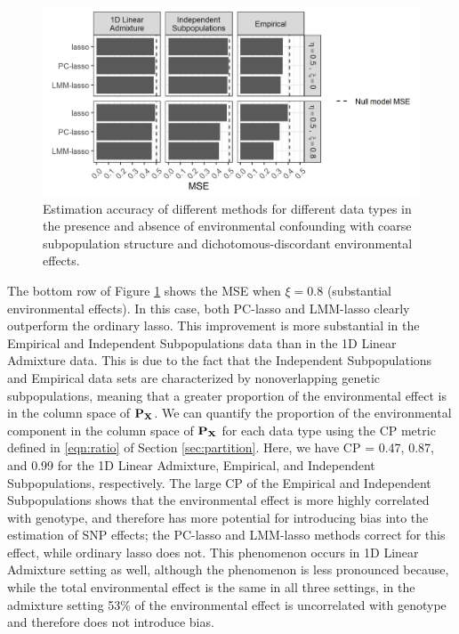 \begin{figure}[H]
    \centering
    \includegraphics[width = \textwidth]{figures/beta_mse.png}
    \caption{Estimation accuracy of different methods for different data types in the presence and absence of environmental confounding with coarse subpopulation structure and dichotomous-discordant environmental effects.}
    \label{fig:mse}
\end{figure}

The bottom row of Figure \ref{fig:mse} shows the MSE when $\xi = 0.8$ (substantial environmental effects). In this case, both PC-lasso and LMM-lasso clearly outperform the ordinary lasso. This improvement is more substantial in the Empirical and Independent Subpopulations data than in the 1D Linear Admixture data. This is due to the fact that the Independent Subpopulations and Empirical data sets are characterized by nonoverlapping genetic subpopulations, meaning that a greater proportion of the environmental effect is in the column space of $\mathbf{P}_{\mathbf{X}}$. We can quantify the proportion of the environmental component in the column space of $\mathbf{P}_{\mathbf{X}}$ for each data type using the CP metric defined in \eqref{eqn:ratio} of Section \ref{sec:partition}. Here, we have CP = 0.47, 0.87, and 0.99 for the 1D Linear Admixture, Empirical, and Independent Subpopulations, respectively. The large CP of the Empirical and Independent Subpopulations shows that the environmental effect is more highly correlated with genotype, and therefore has more potential for introducing bias into the estimation of SNP effects; the PC-lasso and LMM-lasso methods correct for this effect, while ordinary lasso does not.  This phenomenon occurs in 1D Linear Admixture setting as well, although the phenomenon is less pronounced because, while the total environmental effect is the same in all three settings, in the admixture setting 53\% of the environmental effect is uncorrelated with genotype and therefore does not introduce bias.

